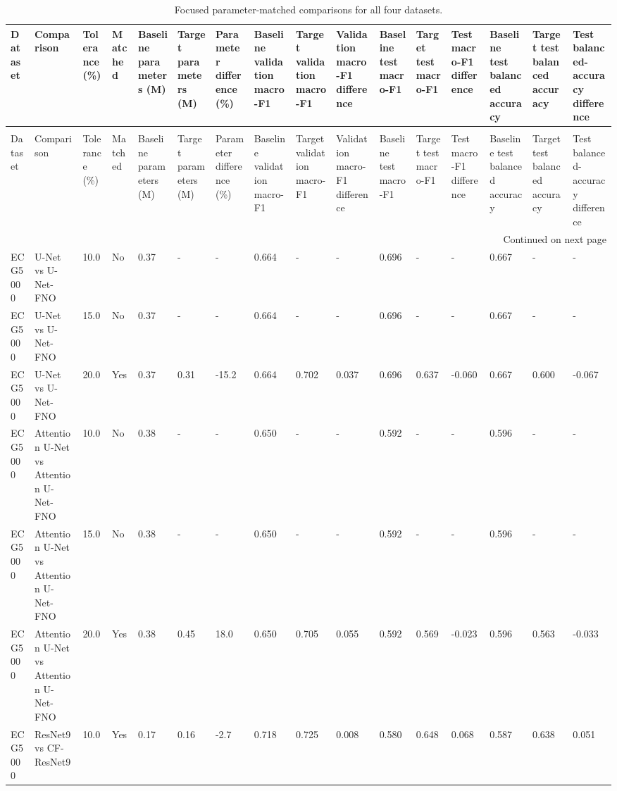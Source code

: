 \begin{longtable}{llllllllllllllll}
\caption{Focused parameter-matched comparisons for all four datasets.} \label{tab:paired_fno_comparison_all_datasets} \\
\toprule
Dataset & Comparison & Tolerance (\%) & Matched & Baseline parameters (M) & Target parameters (M) & Parameter difference (\%) & Baseline validation macro-F1 & Target validation macro-F1 & Validation macro-F1 difference & Baseline test macro-F1 & Target test macro-F1 & Test macro-F1 difference & Baseline test balanced accuracy & Target test balanced accuracy & Test balanced-accuracy difference \\
\midrule
\endfirsthead
\caption[]{Focused parameter-matched comparisons for all four datasets.} \\
\toprule
Dataset & Comparison & Tolerance (\%) & Matched & Baseline parameters (M) & Target parameters (M) & Parameter difference (\%) & Baseline validation macro-F1 & Target validation macro-F1 & Validation macro-F1 difference & Baseline test macro-F1 & Target test macro-F1 & Test macro-F1 difference & Baseline test balanced accuracy & Target test balanced accuracy & Test balanced-accuracy difference \\
\midrule
\endhead
\midrule
\multicolumn{16}{r}{Continued on next page} \\
\midrule
\endfoot
\bottomrule
\endlastfoot
ECG5000 & U-Net vs U-Net-FNO & 10.0 & No & 0.37 & - & - & 0.664 & - & - & 0.696 & - & - & 0.667 & - & - \\
ECG5000 & U-Net vs U-Net-FNO & 15.0 & No & 0.37 & - & - & 0.664 & - & - & 0.696 & - & - & 0.667 & - & - \\
ECG5000 & U-Net vs U-Net-FNO & 20.0 & Yes & 0.37 & 0.31 & -15.2 & 0.664 & 0.702 & 0.037 & 0.696 & 0.637 & -0.060 & 0.667 & 0.600 & -0.067 \\
ECG5000 & Attention U-Net vs Attention U-Net-FNO & 10.0 & No & 0.38 & - & - & 0.650 & - & - & 0.592 & - & - & 0.596 & - & - \\
ECG5000 & Attention U-Net vs Attention U-Net-FNO & 15.0 & No & 0.38 & - & - & 0.650 & - & - & 0.592 & - & - & 0.596 & - & - \\
ECG5000 & Attention U-Net vs Attention U-Net-FNO & 20.0 & Yes & 0.38 & 0.45 & 18.0 & 0.650 & 0.705 & 0.055 & 0.592 & 0.569 & -0.023 & 0.596 & 0.563 & -0.033 \\
ECG5000 & ResNet9 vs CF-ResNet9 & 10.0 & Yes & 0.17 & 0.16 & -2.7 & 0.718 & 0.725 & 0.008 & 0.580 & 0.648 & 0.068 & 0.587 & 0.638 & 0.051 \\

\end{longtable}
